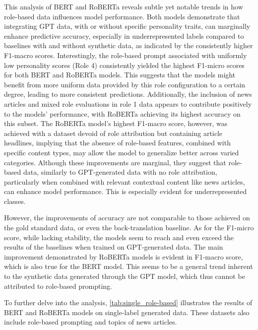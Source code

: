 \documentclass[manuscript]{clv3}
\begin{document}
This analysis of BERT and RoBERTa reveals subtle yet notable trends in how role-based data influences model performance. Both models demonstrate that integrating GPT data, with or without specific personality traits, can marginally enhance predictive accuracy, especially in underrepresented labels compared to baselines with and without synthetic data, as indicated by the consistently higher F1-macro scores. Interestingly, the role-based prompt associated with uniformly low personality scores (Role 4) consistently yielded the highest F1-micro scores for both BERT and RoBERTa models. This suggests that the models might benefit from more uniform data provided by this role configuration to a certain degree, leading to more consistent predictions. Additionally, the inclusion of news articles and mixed role evaluations in role 1 data appears to contribute positively to the models’ performance, with RoBERTa achieving its highest accuracy on this subset. The RoBERTa model’s highest F1-macro score, however, was achieved with a dataset devoid of role attribution but containing article headlines, implying that the absence of role-based features, combined with specific content types, may allow the model to generalize better across varied categories. Although these improvements are marginal, they suggest that role-based data, similarly to GPT-generated data with no role attribution, particularly when combined with relevant contextual content like news articles, can enhance model performance. This is especially evident for underrepresented classes. 

However, the improvements of accuracy are not comparable to those achieved on the gold standard data, or even the back-translation baseline. As for the F1-micro score, while lacking stability, the models seem to reach and even exceed the results of the baselines when trained on GPT-generated data. The main improvement demonstrated by RoBERTa models is evident in F1-macro score, which is also true for the BERT model. This seems to be a general trend inherent to the synthetic data generated through the GPT model, which thus cannot be attributed to role-based prompting.

To further delve into the analysis, \autoref{tab:single_role-based} illustrates the results of BERT and RoBERTa models on single-label generated data. These datasets also include role-based prompting and topics of news articles.
\end{document}
